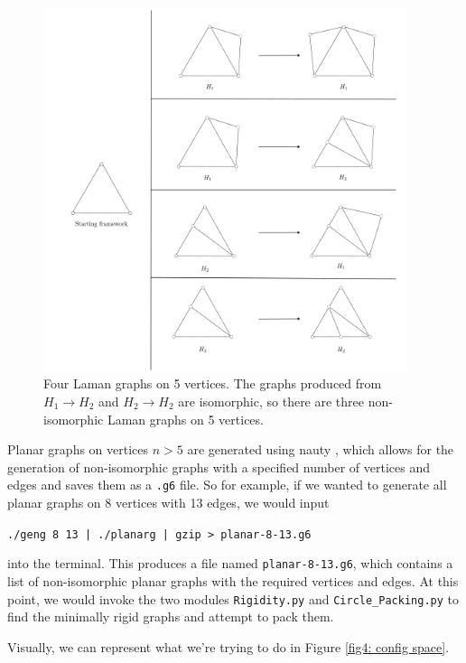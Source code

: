 \begin{figure}[htbp]
    \centering
    \includegraphics[width = 0.95\textwidth]{Chapter 4/4. n=5.png}
    \caption{Four Laman graphs on 5 vertices. The graphs produced from $H_1 \rightarrow H_2$ and $H_2 \rightarrow H_2$ are isomorphic, so there are three non-isomorphic Laman graphs on 5 vertices.}
    \label{fig4: n = 5 Laman}
\end{figure}


\begin{flushleft}
Planar graphs on vertices $n > 5$ are generated using nauty \cite{nauty}, which allows for the generation of non-isomorphic graphs with a specified number of vertices and edges and saves them as a \texttt{.g6} file. So for example, if we wanted to generate all planar graphs on 8 vertices with 13 edges, we would input
\end{flushleft}

\begin{center}
\texttt{./geng 8 13 | ./planarg | gzip > planar-8-13.g6}    
\end{center}

\noindent
into the terminal. This produces a file named \texttt{planar-8-13.g6}, which contains a list of non-isomorphic planar graphs with the required vertices and edges. At this point, we would invoke the two modules \texttt{Rigidity.py} and \texttt{Circle\_Packing.py} to find the minimally rigid graphs and attempt to pack them. 
\clearpage
\begin{flushleft}
Visually, we can represent what we're trying to do in Figure \ref{fig4: config space}.
\end{flushleft}

